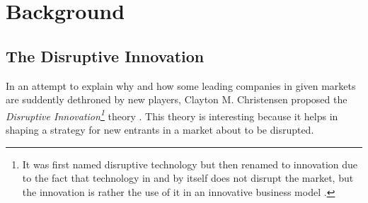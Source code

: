 \documentclass[a4paper,10pt]{article}
\begin{document}

\newpage 

\section{Background}





\subsection{The Disruptive Innovation}
In an attempt to explain why and how some leading companies in given markets are suddently dethroned by new players, 
Clayton M. Christensen proposed the \emph{Disruptive Innovation\footnote{It was first named disruptive technology but then renamed to innovation due 
  to the fact that technology in and by itself does not disrupt the market, but the innovation is rather the use of it in 
  an innovative business model \cite{scientificArticleDisruptiveInnovationBetterTheory}.}} 
theory \cite{innovatorsSolution}.
This theory is interesting because it helps in shaping a strategy for new entrants in a market about to be disrupted.
\\
\end{document}
